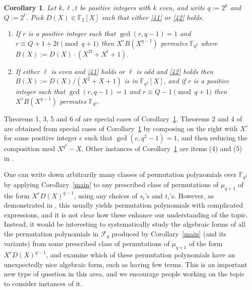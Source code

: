 \documentclass[11pt]{amsart}
\newtheorem{cor}[equation]{Corollary}
\theoremstyle{definition}
\newcommand{\F}{\mathbb{F}}
\begin{document}
\begin{cor}\label{main2}
Let $k,\ell,t$ be positive integers with $k$ even, and write $q:=2^k$ and $Q:=2^\ell$.  Pick $D(X)\in\F_2[X]$ such that either \eqref{41} or \eqref{42} holds.
\begin{enumerate}
\item\label{51} If $r$ is a positive integer such that $\gcd(r,q-1)=1$ and $r\equiv Q+1+2t\pmod{q+1}$ then $X^r B(X^{q-1})$ permutes\/ $\F_{q^2}$ where $B(X):=D(X)\cdot (X^{2t}+X^t+1)$.
\item\label{52} If either $\ell$ is even and \eqref{41} holds or $\ell$ is odd and \eqref{42} holds then $B(X):=D(X)/(X^2+X+1)$ is in\/ $\F_{q^2}[X]$, and if $r$ is a positive integer such that $\gcd(r,q-1)=1$ and $r\equiv Q-1\pmod{q+1}$ then $X^r B(X^{q-1})$ permutes\/ $\F_{q^2}$.
\end{enumerate}
\end{cor}

Theorems 1, 3, 5 and 6 of \cite{SGZWL} are special cases of Corollary~\ref{main2}. 
Theorems 2 and 4 of \cite{SGZWL} are obtained from special cases of Corollary~\ref{main2} by composing on the right with $X^e$ for some positive integer $e$ such that $\gcd(e,q^2-1)=1$, and then reducing the composition mod $X^{q^2}-X$.  Other instances of Corollary~\ref{main2} are items (4) and (5) in \cite[Example~1]{DeZh}.

One can write down arbitrarily many classes of permutation polynomials over $\F_{q^2}$ by applying Corollary~\ref{main} to any prescribed class of permutations of $\mu_{q+1}$ of the form $X^r D(X)^{q-1}$, using any choices of $s_i$'s and $t_i$'s.  However, as demonstrated in \cite{SGZWL}, this usually yields permutation polynomials with complicated expressions, and it is not clear how these enhance our understanding of the topic.  Instead, it would be interesting to systematically study the algebraic forms of all the permutation polynomials in $\mathcal F_q$ produced by Corollary~\ref{main} (and its variants) from some prescribed class of permutations of $\mu_{q+1}$ of the form $X^r D(X)^{q-1}$, and examine which of these permutation polynomials have an unexpectedly nice algebraic form, such as having few terms.
This is an important new type of question in this area, and we encourage people working on the topic to consider instances of it.
\end{document}
